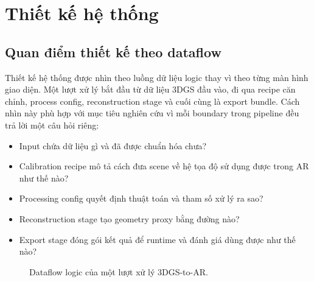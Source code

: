 \section{Thiết kế hệ thống}

\subsection{Quan điểm thiết kế theo dataflow}

Thiết kế hệ thống được nhìn theo luồng dữ liệu logic thay vì theo từng màn hình giao diện. Một lượt xử lý bắt đầu từ dữ liệu 3DGS đầu vào, đi qua recipe căn chỉnh, process config, reconstruction stage và cuối cùng là export bundle. Cách nhìn này phù hợp với mục tiêu nghiên cứu vì mỗi boundary trong pipeline đều trả lời một câu hỏi riêng:

\begin{itemize}
  \item Input chứa dữ liệu gì và đã được chuẩn hóa chưa?
  \item Calibration recipe mô tả cách đưa scene về hệ tọa độ sử dụng được trong AR như thế nào?
  \item Processing config quyết định thuật toán và tham số xử lý ra sao?
  \item Reconstruction stage tạo geometry proxy bằng đường nào?
  \item Export stage đóng gói kết quả để runtime và đánh giá dùng được như thế nào?
\end{itemize}

\begin{figure}[H]
\centering
{}
\caption{Dataflow logic của một lượt xử lý 3DGS-to-AR.}
\end{figure}

